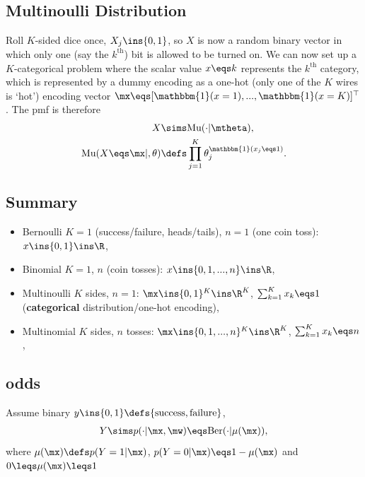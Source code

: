 \documentclass[11pt,a4paper]{report}
\begin{document}
\subsection{Multinoulli Distribution}
Roll $K$-sided dice once, $X_{j}\ins\{0,1\}$, so $X$ is now a random binary vector in which only one (say the $k^{\text{th}}$) bit is allowed to be turned on. We can now set up a $K$-categorical problem where the scalar value $x\eqs k$ represents the $k^\text{th}$ category, which is represented by a dummy encoding as a one-hot (only one of the $K$ wires is `hot') encoding vector $\mx\eqs[\mathbbm{1}(x=1),...,\mathbbm{1}(x=K)]^{\top}$. The pmf is therefore
\begin{align*}
	X\sims&\text{Mu}(\cdot|\mtheta),\\
	\text{Mu}(X\eqs \mx|,\theta)\defs&\prod_{j=1}^{K}\theta_{j}^{\mathbbm{1}(x_{j}\eqs1)}.
\end{align*}

\subsection{Summary}
\begin{itemize}
	\item Bernoulli $K=1$ (success/failure, heads/tails), $n=1$ (one coin toss): $x\ins\{0,1\}\ins\R$, 
	\item Binomial $K=1$, $n$ (coin tosses): $x\ins\{0,1,...,n\}\ins\R$,
	\item Multinoulli $K$ sides, $n=1$: $\mx\ins\{0,1\}^{K}\ins\R^{K}$, $\sum_{k=1}^{K}x_{k}\eqs 1$ (\textbf{categorical} distribution/one-hot encoding),
    \item Multinomial $K$ sides, $n$ tosses: $\mx\ins\{0,1,...,n\}^{K}\ins\R^{K}$, $\sum_{k=1}^{K}x_{k}\eqs n$,
\end{itemize}

\subsection{odds}

Assume binary $y\ins\{0,1\}\defs\{\text{success},\text{failure}\}$,
\begin{align*}
	Y\sims p(\cdot|\mx,\mw)\eqs\text{Ber}(\cdot|\mu(\mx)),
\end{align*}
where $\mu(\mx)\defs p(Y=1|\mx)$, $p(Y=0|\mx)\eqs 1-\mu(\mx)$ and $0\leqs\mu(\mx)\leqs 1$

\printbibliography
\end{document}
